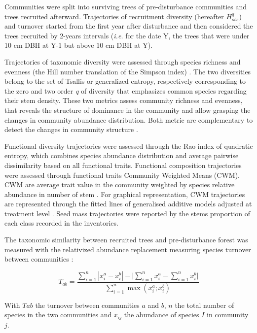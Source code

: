 \documentclass[fleqn,10pt]{ArtEcoFoG} %
\begin{document}
\color{red} Communities were split into surviving trees of
pre-disturbance communities and trees recruited afterward. Trajectories
of recruitment diversity (hereafter \(H^q_{obs}\)) and turnover started
from the first year after disturbance and then considered the trees
recruited by 2-years intervals (\emph{i.e.} for the date Y, the trees
that were under 10 cm DBH at Y-1 but above 10 cm DBH at Y).
\color{black}

Trajectories of taxonomic diversity were assessed through species
richness and evenness (the Hill number translation of the Simpson index)
\citep{Chao2015, Marcon2015}. The two diversities belong to the set of
Tsallis or generalized entropy, respectively corresponding to the zero
and two order \emph{q} of diversity that emphasizes common species
\color{red} regarding their stem density. These two metrics assess
community richness and evenness, that reveals the structure of dominance
in the community and allow grasping the changes in community abundance
distribution. Both metric are complementary to detect the changes in
community structure \citep{Magurran2004}. \color{black}

Functional diversity trajectories were assessed through the Rao index of
quadratic entropy, which combines species abundance distribution and
average pairwise dissimilarity based on all functional traits.
Functional composition trajectories were assessed through functional
traits Community Weighted Means (CWM). CWM are average trait value in
the community weighted by species relative abundance in number of stem
\citep{Diaz2007}. For graphical representation, CWM trajectories are
represented through the fitted lines of generalised additive models
adjusted at treatment level \citep{Wood2011}. Seed mass trajectories
were reported by the stems proportion of each class recorded in the
inventories.

\color{red} The taxonomic similarity between recruited trees and
pre-disturbance forest was measured with the relativized abundance
replacement measuring species turnover between communities
\citep{Podani2013a}:

\begin{equation}
T_{ab}=\frac{\sum_{i=1}^{n}|x_i^a - x_i^b| - \bigg| \sum_{i=1}^{n}{x_i^a} - \sum_{i=1}^{n}{x_i^b} \bigg|}{\sum_{i=1}^{n}\max{\left( x_i^a;x_i^b \right)}}
\label{eq:formNestedness}
\end{equation}

With \(Tab\) the turnover between communities \(a\) and \(b\), \(n\) the
total number of species in the two communities and \(x_{ij}\) the
abundance of species \(I\) in community \(j\).
\end{document}
